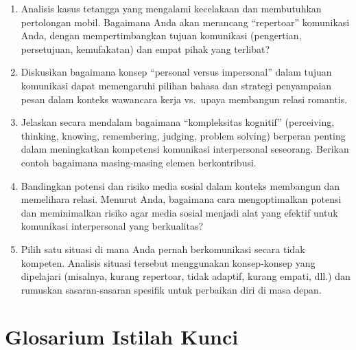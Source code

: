 \documentclass[
  letterpaper,
  DIV=11,
  numbers=noendperiod]{scrreprt}
\providecommand{\tightlist}{%
  \setlength{\itemsep}{0pt}\setlength{\parskip}{0pt}}
\begin{document}
\begin{enumerate}
\def\labelenumi{\arabic{enumi}.}
\tightlist
\item
  Analisis kasus tetangga yang mengalami kecelakaan dan membutuhkan
  pertolongan mobil. Bagaimana Anda akan merancang ``repertoar''
  komunikasi Anda, dengan mempertimbangkan tujuan komunikasi
  (pengertian, persetujuan, kemufakatan) dan empat pihak yang terlibat?
\item
  Diskusikan bagaimana konsep ``personal versus impersonal'' dalam
  tujuan komunikasi dapat memengaruhi pilihan bahasa dan strategi
  penyampaian pesan dalam konteks wawancara kerja vs.~upaya membangun
  relasi romantis.
\item
  Jelaskan secara mendalam bagaimana ``kompleksitas kognitif''
  (perceiving, thinking, knowing, remembering, judging, problem solving)
  berperan penting dalam meningkatkan kompetensi komunikasi
  interpersonal seseorang. Berikan contoh bagaimana masing-masing elemen
  berkontribusi.
\item
  Bandingkan potensi dan risiko media sosial dalam konteks membangun dan
  memelihara relasi. Menurut Anda, bagaimana cara mengoptimalkan potensi
  dan meminimalkan risiko agar media sosial menjadi alat yang efektif
  untuk komunikasi interpersonal yang berkualitas?
\item
  Pilih satu situasi di mana Anda pernah berkomunikasi secara tidak
  kompeten. Analisis situasi tersebut menggunakan konsep-konsep yang
  dipelajari (misalnya, kurang repertoar, tidak adaptif, kurang empati,
  dll.) dan rumuskan sasaran-sasaran spesifik untuk perbaikan diri di
  masa depan.
\end{enumerate}

\section{Glosarium Istilah Kunci}\label{glosarium-istilah-kunci}
\end{document}
